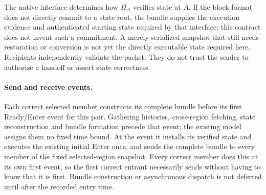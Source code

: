 The native interface determines how $\Pi_A$ verifies state at $A$.
If the block format does not directly commit to a state root, the
bundle supplies the execution evidence and authenticated starting state
required by that interface; this contract does not invent such a
commitment. A merely serialized snapshot that still needs restoration
or conversion is not yet the directly executable state required here.
Recipients independently validate the packet. They do not trust the
sender to authorize a handoff or assert state correctness.

\paragraph{Send and receive events.}
Each correct selected member constructs its complete bundle before its
first Ready/Enter event for this pair. Gathering histories, cross-region
fetching, state reconstruction and bundle formation precede that event;
the existing model assigns them no fixed time bound. At the event it
installs its verified state and executes the existing initial Enter
once, and sends the complete bundle to every member of the fixed
selected-region snapshot. Every correct member does this at its own
first event, so the first correct entrant necessarily sends without
having to know that it is first. Bundle construction or asynchronous
dispatch is not deferred until after the recorded entry time.

